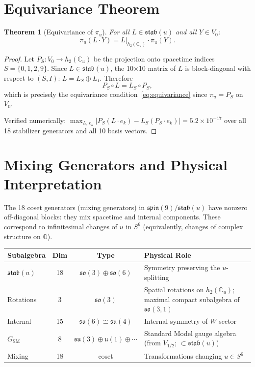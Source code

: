 \documentclass[11pt]{article}
\newtheorem{theorem}{Theorem}
\theoremstyle{definition}
\theoremstyle{remark}
\begin{document}
\section{Equivariance Theorem}

\begin{theorem}[Equivariance of $\pi_u$]\label{thm:equiv}
For all $L \in \mathfrak{stab}(u)$ and all $Y \in V_0$:
\begin{equation}\label{eq:equivariance}
  \pi_u(L \cdot Y) = L\big|_{h_2(\mathbb{C}_u)} \cdot \pi_u(Y).
\end{equation}
\end{theorem}

\begin{proof}
Let $P_S : V_0 \to h_2(\mathbb{C}_u)$ be the projection onto spacetime
indices $S = \{0,1,2,9\}$.  Since $L \in \mathfrak{stab}(u)$, the
10$\times$10 matrix of $L$ is block-diagonal with respect to $(S, I)$:
$L = L_S \oplus L_I$.  Therefore
\[
  P_S \circ L = L_S \circ P_S,
\]
which is precisely the equivariance condition~\eqref{eq:equivariance}
since $\pi_u = P_S$ on $V_0$.

Verified numerically: $\max_{L,\, e_k}
|P_S(L \cdot e_k) - L_S(P_S \cdot e_k)| = 5.2 \times 10^{-17}$
over all 18 stabilizer generators and all 10 basis vectors.
\end{proof}

\section{Mixing Generators and Physical Interpretation}

The 18 coset generators (mixing generators) in $\mathfrak{spin}(9) / \mathfrak{stab}(u)$
have nonzero off-diagonal blocks: they mix spacetime and internal
components.  These correspond to infinitesimal changes of $u$ in $S^6$
(equivalently, changes of complex structure on $\mathbb{O}$).

\begin{center}
\begin{tabular}{lccp{6cm}}
\toprule
\textbf{Subalgebra} & \textbf{Dim} & \textbf{Type} & \textbf{Physical Role} \\
\midrule
$\mathfrak{stab}(u)$ & 18 & $\mathfrak{so}(3) \oplus \mathfrak{so}(6)$
  & Symmetry preserving the $u$-splitting \\
\quad Rotations & 3 & $\mathfrak{so}(3)$
  & Spatial rotations on $h_2(\mathbb{C}_u)$; maximal compact
    subalgebra of $\mathfrak{so}(3,1)$ \\
\quad Internal & 15 & $\mathfrak{so}(6) \cong \mathfrak{su}(4)$
  & Internal symmetry of $W$-sector \\
$G_{\mathrm{SM}}$ & 8 & $\mathfrak{su}(3) \oplus \mathfrak{u}(1) \oplus \cdots$
  & Standard Model gauge algebra (from $V_{1/2}$; $\subset\!\mathfrak{stab}(u)$) \\
Mixing & 18 & coset
  & Transformations changing $u \in S^6$ \\
\bottomrule
\end{tabular}
\end{center}
\end{document}

